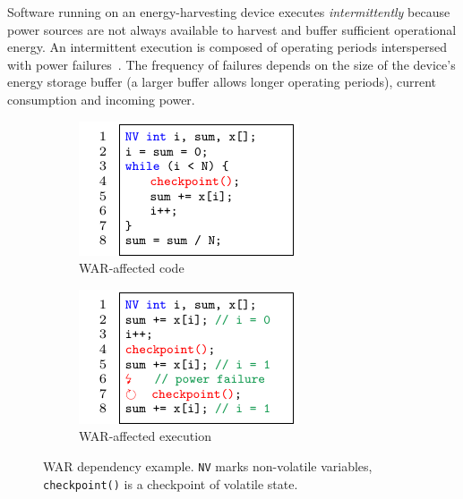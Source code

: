 Software running on an energy-harvesting device executes {\em intermittently} because power sources are not always available to harvest and buffer sufficient operational energy. An intermittent execution is composed of operating periods interspersed with power failures~\cite{dino,chain,alpaca,ratchet}. The frequency of failures depends on the size of the device's energy storage buffer (a larger buffer allows longer operating periods), current consumption and incoming power.

\begin{figure}		
	\centering
	\begin{minipage}{.8\textwidth}
	\begin{subfigure}{.5\columnwidth}
			\includegraphics[width=\columnwidth, trim={.3cm 0 0 0}]{figures/war-example.pdf}
		\caption{WAR-affected code}
		\label{fig:war-example}
	\end{subfigure}
	\begin{subfigure}{.5\columnwidth}
			\includegraphics[width=\columnwidth,trim={.3cm 0 0 0 }  ]{figures/war-execution.pdf}
		\caption{WAR-affected execution}
		\label{fig:war-execution}
	\end{subfigure}
	\caption{WAR dependency example. \texttt{NV} marks non-volatile variables, \texttt{checkpoint()} is a checkpoint of volatile state.	\label{fig:w-a-r}}
	\end{minipage}
\end{figure}

